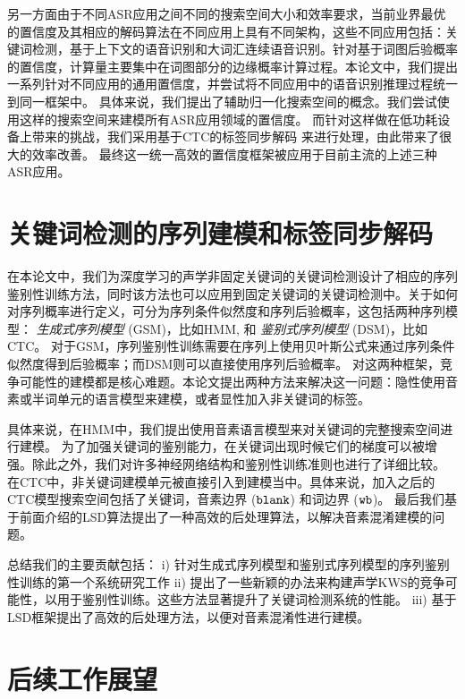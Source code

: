 另一方面由于不同ASR应用之间不同的搜索空间大小和效率要求，当前业界最优的置信度及其相应的解码算法在不同应用上具有不同架构，这些不同应用包括：关键词检测，基于上下文的语音识别和大词汇连续语音识别。针对基于词图后验概率的置信度，计算量主要集中在词图部分的边缘概率计算过程。本论文中，我们提出一系列针对不同应用的通用置信度，并尝试将不同应用中的语音识别推理过程统一到同一框架中。
%
具体来说，我们提出了辅助归一化搜索空间的概念。我们尝试使用这样的搜索空间来建模所有ASR应用领域的置信度。 %
而针对这样做在低功耗设备上带来的挑战，我们采用基于CTC的标签同步解码\cite{Chen+2016} 来进行处理，由此带来了很大的效率改善。
最终这一统一高效的置信度框架被应用于目前主流的上述三种 ASR应用。


\section{关键词检测的序列建模和标签同步解码}
\label{chap:sum-kws}

在本论文中，我们为深度学习的声学非固定关键词的关键词检测设计了相应的序列鉴别性训练方法，同时该方法也可以应用到固定关键词的关键词检测中。关于如何对序列概率进行定义，可分为序列条件似然度和序列后验概率，这包括两种序列模型： {\em 生成式序列模型} (GSM)，比如HMM, 和 {\em 鉴别式序列模型} (DSM)，比如 CTC。
对于GSM，序列鉴别性训练需要在序列上使用贝叶斯公式来通过序列条件似然度得到后验概率；而DSM则可以直接使用序列后验概率。
%
对这两种框架，竞争可能性的建模都是核心难题。本论文提出两种方法来解决这一问题：隐性使用音素或半词单元的语言模型来建模，或者显性加入非关键词的标签。

具体来说，在HMM中，我们提出使用音素语言模型来对关键词的完整搜索空间进行建模。
为了加强关键词的鉴别能力，在关键词出现时候它们的梯度可以被增强。除此之外，我们对许多神经网络结构和鉴别性训练准则也进行了详细比较。
在CTC中，非关键词建模单元被直接引入到建模当中。具体来说，加入之后的CTC模型搜索空间包括了关键词，音素边界 ($\tt blank$) 和词边界 ($\tt wb$)。 
最后我们基于前面介绍的LSD算法提出了一种高效的后处理算法，以解决音素混淆建模的问题。

总结我们的主要贡献包括：
i) 针对生成式序列模型和鉴别式序列模型的序列鉴别性训练的第一个系统研究工作
ii) 提出了一些新颖的办法来构建声学KWS的竞争可能性，以用于鉴别性训练。这些方法显著提升了关键词检测系统的性能。
iii) 基于 LSD框架提出了高效的后处理方法，以便对音素混淆性进行建模。


\section{后续工作展望}
\label{chap:sum-future}

